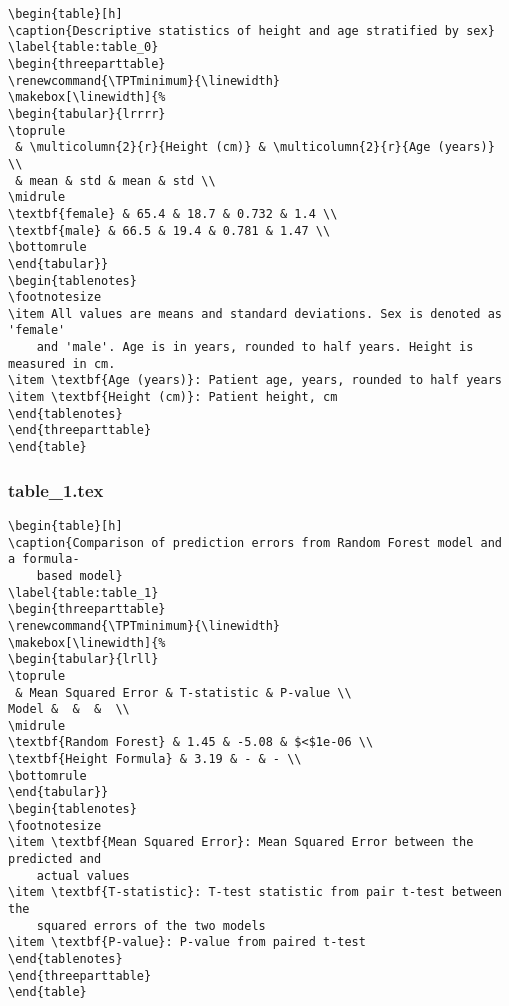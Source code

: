 \documentclass[11pt]{article}
\begin{document}
\begin{Verbatim}[tabsize=4]
\begin{table}[h]
\caption{Descriptive statistics of height and age stratified by sex}
\label{table:table_0}
\begin{threeparttable}
\renewcommand{\TPTminimum}{\linewidth}
\makebox[\linewidth]{%
\begin{tabular}{lrrrr}
\toprule
 & \multicolumn{2}{r}{Height (cm)} & \multicolumn{2}{r}{Age (years)} \\
 & mean & std & mean & std \\
\midrule
\textbf{female} & 65.4 & 18.7 & 0.732 & 1.4 \\
\textbf{male} & 66.5 & 19.4 & 0.781 & 1.47 \\
\bottomrule
\end{tabular}}
\begin{tablenotes}
\footnotesize
\item All values are means and standard deviations. Sex is denoted as 'female'
	and 'male'. Age is in years, rounded to half years. Height is measured in cm.
\item \textbf{Age (years)}: Patient age, years, rounded to half years
\item \textbf{Height (cm)}: Patient height, cm
\end{tablenotes}
\end{threeparttable}
\end{table}

\end{Verbatim}

\subsubsection*{table\_1.tex}

\begin{Verbatim}[tabsize=4]
\begin{table}[h]
\caption{Comparison of prediction errors from Random Forest model and a formula-
	based model}
\label{table:table_1}
\begin{threeparttable}
\renewcommand{\TPTminimum}{\linewidth}
\makebox[\linewidth]{%
\begin{tabular}{lrll}
\toprule
 & Mean Squared Error & T-statistic & P-value \\
Model &  &  &  \\
\midrule
\textbf{Random Forest} & 1.45 & -5.08 & $<$1e-06 \\
\textbf{Height Formula} & 3.19 & - & - \\
\bottomrule
\end{tabular}}
\begin{tablenotes}
\footnotesize
\item \textbf{Mean Squared Error}: Mean Squared Error between the predicted and
	actual values
\item \textbf{T-statistic}: T-test statistic from pair t-test between the
	squared errors of the two models
\item \textbf{P-value}: P-value from paired t-test
\end{tablenotes}
\end{threeparttable}
\end{table}

\end{Verbatim}
\end{document}
